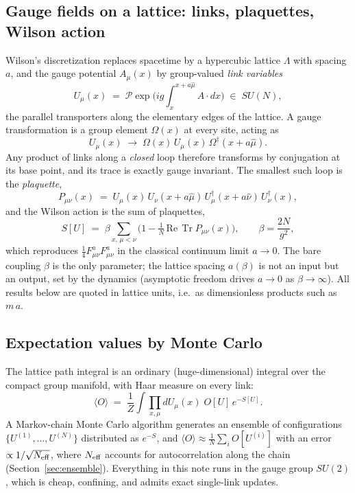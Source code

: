 \documentclass[11pt,a4paper]{article}
\newcommand{\Tr}{\operatorname{Tr}}
\begin{document}
\subsection{Gauge fields on a lattice: links, plaquettes, Wilson action}

Wilson's discretization \cite{Wilson1974} replaces spacetime by a hypercubic
lattice $\Lambda$ with spacing $a$, and the gauge potential $A_\mu(x)$ by
group-valued \emph{link variables}
\begin{equation}
  U_\mu(x) \;=\; \mathcal{P}\exp\!\Big( i g \!\int_x^{x+a\hat\mu}\! A\cdot dx \Big)
  \;\in\; SU(N),
\end{equation}
the parallel transporters along the elementary edges of the lattice. A gauge
transformation is a group element $\Omega(x)$ at every site, acting as
\begin{equation}
  U_\mu(x) \;\longrightarrow\; \Omega(x)\, U_\mu(x)\, \Omega^\dagger(x+a\hat\mu).
  \label{eq:gaugetrafo}
\end{equation}
Any product of links along a \emph{closed} loop therefore transforms by
conjugation at its base point, and its trace is exactly gauge invariant. The
smallest such loop is the \emph{plaquette},
\begin{equation}
  P_{\mu\nu}(x)
  \;=\;
  U_\mu(x)\, U_\nu(x+a\hat\mu)\, U_\mu^\dagger(x+a\hat\nu)\, U_\nu^\dagger(x),
\end{equation}
and the Wilson action is the sum of plaquettes,
\begin{equation}
  S[U] \;=\; \beta \sum_{x,\,\mu<\nu}
  \Big( 1 - \tfrac{1}{N}\,\mathrm{Re}\,\Tr P_{\mu\nu}(x) \Big),
  \qquad
  \beta = \frac{2N}{g^2},
  \label{eq:wilson}
\end{equation}
which reproduces $\tfrac14 F_{\mu\nu}^aF_{\mu\nu}^a$ in the classical
continuum limit $a\to0$. The bare coupling $\beta$ is the only parameter;
the lattice spacing $a(\beta)$ is not an input but an output, set by the
dynamics (asymptotic freedom drives $a\to0$ as $\beta\to\infty$). All results
below are quoted in lattice units, i.e.\ as dimensionless products such as
$m\,a$.

\subsection{Expectation values by Monte Carlo}

The lattice path integral is an ordinary (huge-dimensional) integral over the
compact group manifold, with Haar measure on every link:
\begin{equation}
  \langle O \rangle
  \;=\;
  \frac{1}{Z}\int \prod_{x,\mu} dU_\mu(x)\; O[U]\, e^{-S[U]} .
\end{equation}
A Markov-chain Monte Carlo algorithm generates an ensemble of configurations
$\{U^{(1)},\dots,U^{(N)}\}$ distributed as $e^{-S}$, and
$\langle O\rangle \approx \frac1N \sum_i O[U^{(i)}]$ with an error
$\propto 1/\sqrt{N_{\rm eff}}$, where $N_{\rm eff}$ accounts for
autocorrelation along the chain (Section~\ref{sec:ensemble}). Everything in
this note runs in the gauge group $SU(2)$, which is cheap, confining, and
admits exact single-link updates.
\end{document}
